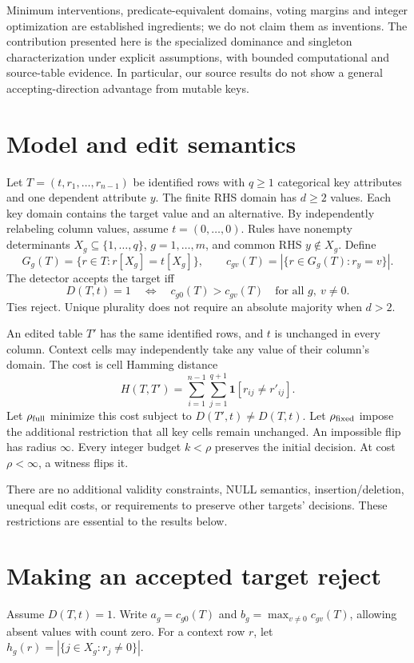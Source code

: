 \documentclass[11pt]{article}
\newcommand{\ind}{\mathbf{1}}
\newcommand{\INF}{\infty}
\begin{document}
Minimum interventions, predicate-equivalent domains, voting margins and integer
optimization are established ingredients; we do not claim them as inventions.
The contribution presented here is the specialized dominance and singleton
characterization under explicit assumptions, with bounded computational and
source-table evidence. In particular, our source results do not show a general
accepting-direction advantage from mutable keys.

\section{Model and edit semantics}
Let $T=(t,r_1,\ldots,r_{n-1})$ be identified rows with $q\geq1$ categorical key
attributes and one dependent attribute $y$. The finite RHS domain has
$d\geq2$ values. Each key domain contains the target value and an alternative.
By independently relabeling column values, assume $t=(0,\ldots,0)$.
Rules have nonempty determinants $X_g\subseteq\{1,\ldots,q\}$, $g=1,\ldots,m$,
and common RHS $y\notin X_g$. Define
\[
 G_g(T)=\{r\in T:r[X_g]=t[X_g]\},\qquad
 c_{gv}(T)=|\{r\in G_g(T):r_y=v\}|.
\]
The detector accepts the target iff
\begin{equation}\label{eq:accept}
 D(T,t)=1\quad\Longleftrightarrow\quad
 c_{g0}(T)>c_{gv}(T)\quad\text{for all }g,\ v\ne0.
\end{equation}
Ties reject. Unique plurality does not require an absolute majority when $d>2$.

An edited table $T'$ has the same identified rows, and $t$ is unchanged in every
column. Context cells may independently take any value of their column's
domain. The cost is cell Hamming distance
\[
 H(T,T')=\sum_{i=1}^{n-1}\sum_{j=1}^{q+1}\ind[r_{ij}\ne r'_{ij}].
\]
Let $\rho_{\rm full}$ minimize this cost subject to $D(T',t)\ne D(T,t)$.
Let $\rho_{\rm fixed}$ impose the additional restriction that all key cells
remain unchanged. An impossible flip has radius $\INF$. Every integer budget
$k<\rho$ preserves the initial decision. At cost $\rho<\INF$, a witness flips it.

There are no additional validity constraints, NULL semantics, insertion/deletion,
unequal edit costs, or requirements to preserve other targets' decisions. These
restrictions are essential to the results below.

\section{Making an accepted target reject}
Assume $D(T,t)=1$. Write $a_g=c_{g0}(T)$ and
$b_g=\max_{v\ne0}c_{gv}(T)$, allowing absent values with count zero.
For a context row $r$, let
$h_g(r)=|\{j\in X_g:r_j\ne0\}|$.
\end{document}
